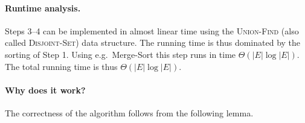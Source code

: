 \bigskip
\noindent{}
\bigskip

\paragraph{Runtime analysis.}
Steps 3--4 can be implemented in almost linear time using the \textsc{Union-Find} (also called
\textsc{Disjoint-Set}) data structure.
The running time is thus dominated by the sorting of Step 1. Using e.g.\ Merge-Sort this step
runs in time $\Theta(|E|\log|E|)$. The total running time is thus $\Theta(|E|\log|E|)$.

\paragraph{Why does it work?}
The correctness of the algorithm follows from the following lemma.


